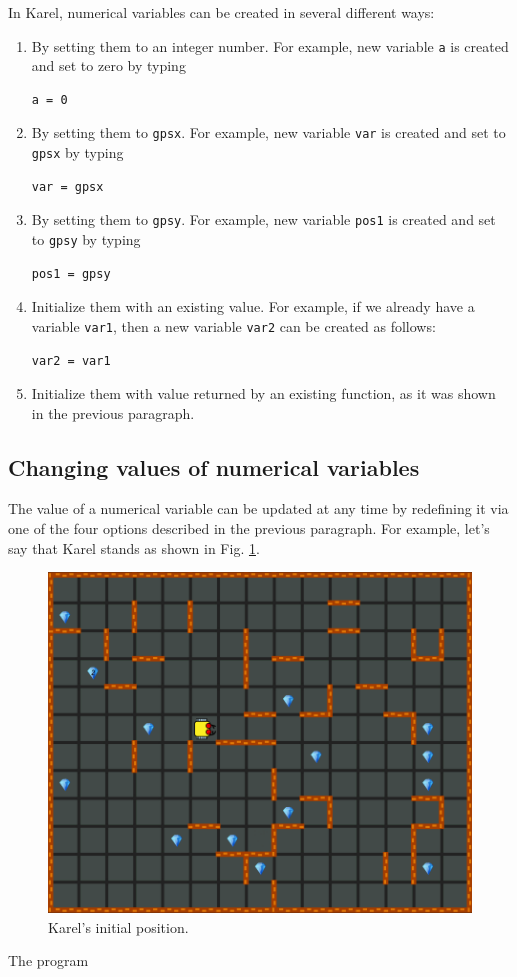 {{{{In Karel, numerical variables can be created in several different ways: 
\begin{enumerate}
\item By setting them to an integer number. For example, new variable {\tt a} is created and set to zero by typing 
\begin{verbatim}
a = 0
\end{verbatim}
\item By setting them to {\tt gpsx}. For example, new variable {\tt var} is created and set to {\tt gpsx} by typing
\begin{verbatim}
var = gpsx
\end{verbatim}
\item By setting them to {\tt gpsy}. For example, new variable {\tt pos1} is created and set to {\tt gpsy} by typing
\begin{verbatim}
pos1 = gpsy
\end{verbatim}
\item Initialize them with an existing value. For example, if we already have a variable {\tt var1}, then a new variable 
{\tt var2} can be created as follows:
\begin{verbatim}
var2 = var1
\end{verbatim}
\item Initialize them with value returned by an existing function, as it was shown in the previous 
paragraph. 
\end{enumerate}

\subsection{Changing values of numerical variables}

The value of a numerical variable can be updated at any time by redefining it via 
one of the four options described in the previous paragraph. For example, let's say that 
Karel stands as shown in Fig. \ref{fig:var1}.
\begin{figure}[!ht]
\begin{center}
\includegraphics[height=0.4\textwidth]{imgk/variables1.png}
\end{center}
\vspace{-4mm}
\caption{Karel's initial position.}
\label{fig:var1}
\end{figure}
\noindent
The program

}}}}
